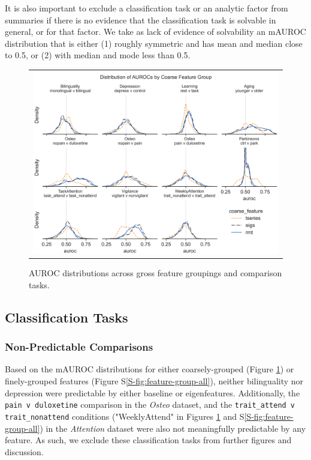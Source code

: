 \documentclass[12pt]{spieman}  %
\newcommand{\code}[1]{\small\texttt{#1}\normalsize}
\begin{document}
\begin{spacing}{2}
It is also important to exclude a classification task or an analytic factor
from summaries if there is no evidence that the classification task is solvable
in general, or for that factor. We take as lack of evidence of solvability an
mAUROC distribution that is either (1) roughly symmetric and has mean and
median close to 0.5, or (2) with median and mode less than 0.5.

\begin{figure}
\begin{center}
\begin{tabular}{c}
\includegraphics[width=6.5in]{coarse_feature_overall_by_subgroup.png}
\end{tabular}
\end{center}
\caption
{ \label{fig:main-results}
AUROC distributions across gross feature groupings and comparison tasks.}
\end{figure}

\subsection{Classification Tasks}

\subsubsection{Non-Predictable Comparisons}
Based on the mAUROC distributions for either coarsely-grouped (Figure
\ref{fig:main-results}) or finely-grouped features (Figure
S\ref{S-fig:feature-group-all}), neither bilinguality nor depression were
predictable by either baseline or eigenfeatures. Additionally, the \code{pain v
duloxetine} comparison in the \textit{Osteo} dataset, and the
\code{trait\_attend v trait\_nonattend} conditions ("WeeklyAttend" in Figures
\ref{fig:main-results} and S\ref{S-fig:feature-group-all}) in the \textit{Attention}
dataset were also not meaningfully predictable by any feature. As such, we exclude
these classification tasks from further figures and discussion.


\end{spacing}
\end{document}
